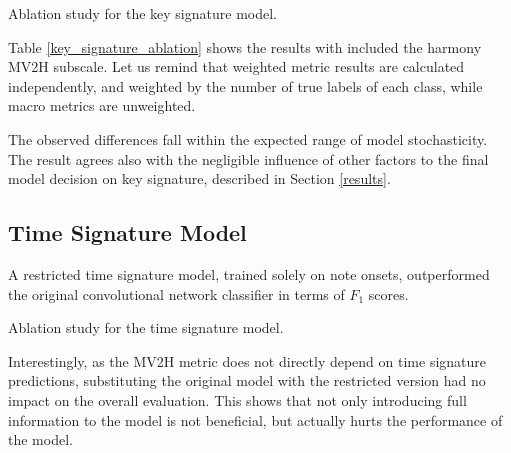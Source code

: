 \begin{table}[ht!]
\centering

\caption[Ablation study for the key signature model.]{Ablation study for the key signature model.}
\label{key_signature_ablation}
\end{table}

Table \ref{key_signature_ablation} shows the results with included the harmony MV2H subscale. Let us remind that weighted metric results are calculated independently, and weighted by the number of true labels of each class, while macro metrics are unweighted.

The observed differences fall within the expected range of model stochasticity. The result agrees also with the negligible influence of other factors to the final model decision on key signature, described in Section \ref{results}.

\subsection{Time Signature Model}

A restricted time signature model, trained solely on note onsets, outperformed the original convolutional network classifier in terms of $F_1$ scores.

\begin{table}[ht!]
\centering

\caption[Ablation study for the time signature model.]{Ablation study for the time signature model.}
\label{time_signature_ablation}
\end{table}

Interestingly, as the MV2H metric does not directly depend on time signature predictions, substituting the original model with the restricted version had no impact on the overall evaluation. This shows that not only introducing full information to the model is not beneficial, but actually hurts the performance of the model. 
